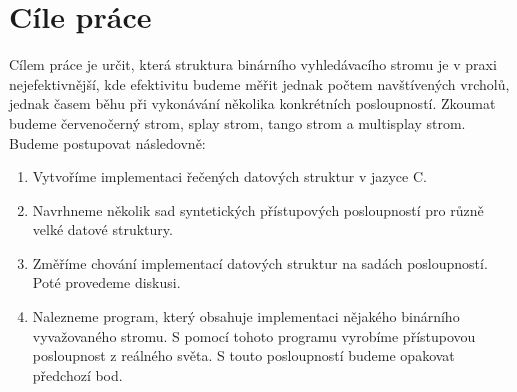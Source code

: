 
\chapter{Cíle práce}

Cílem práce je určit, která struktura binárního vyhledávacího stromu je v praxi nejefektivnější, kde efektivitu budeme měřit jednak počtem navštívených vrcholů, jednak časem běhu při vykonávání několika konkrétních posloupností. Zkoumat budeme červenočerný strom, splay strom, tango strom a multisplay strom. Budeme postupovat následovně:

\begin{enumerate}
\item Vytvoříme implementaci řečených datových struktur v jazyce C.
\item Navrhneme několik sad syntetických přístupových posloupností pro různě velké datové struktury.
\item Změříme chování implementací datových struktur na sadách posloupností. Poté provedeme diskusi.
\item Nalezneme program, který obsahuje implementaci nějakého binárního vyvažovaného stromu. S pomocí tohoto programu vyrobíme přístupovou posloupnost z reálného světa. S touto posloupností budeme opakovat předchozí bod.
\end{enumerate}
